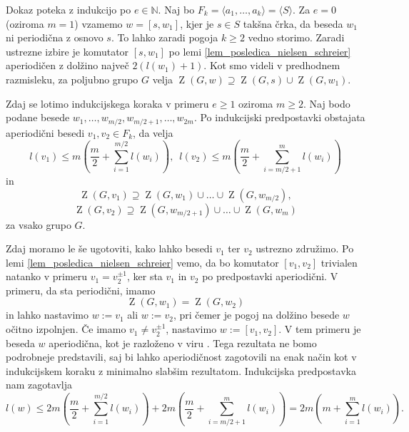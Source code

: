     \begin{dokaz}
        Dokaz poteka z indukcijo po $e \in  \mathbb{N}$. Naj bo $F_k = \langle a_1, \ldots , a_{k} \rangle = \langle S \rangle$.  Za $e = 0$ (oziroma $m = 1$) vzamemo $w = [s, w_1]$, kjer je $s \in S$ takšna črka, da beseda $w_1$ ni periodična z osnovo $s$. 
        To lahko zaradi pogoja $k \ge 2$ vedno storimo. Zaradi ustrezne izbire je komutator $[s, w_1]$ po lemi \ref{lem_posledica_nielsen_schreier} aperiodičen z dolžino največ $2(l(w_1)  + 1)$.
        Kot smo videli v predhodnem razmisleku, za poljubno grupo $G$ velja $\operatorname{Z}(G, w) \supseteq \operatorname{Z}(G, s) \cup \operatorname{Z}(G, w_1)$.
        
        Zdaj se lotimo indukcijskega koraka v primeru $e \ge 1$ oziroma $m \ge 2$. Naj bodo podane besede $w_1, \ldots, w_{m / 2}, w_{m / 2 + 1}, \ldots, w_{2m}$. Po indukcijski predpostavki obstajata aperiodični besedi $v_1, v_2 \in  F_{k}$,  da velja
        \begin{equation*}
        l(v_1) \le m \left(\frac{m}{2} + \sum_{i=1}^{m / 2} l(w_{i}) \right), \,\,\, l(v_2) \le m \left(\frac{m}{2} + \sum_{i= m / 2 + 1}^{m} l(w_{i}) \right)
        \end{equation*}  
        in \begin{equation*}
        \operatorname{Z}(G, v_1) \supseteq \operatorname{Z}(G, w_1) \cup \ldots \cup \operatorname{Z}(G, w_{m / 2}),
        \end{equation*}  
        \begin{equation*}
            \operatorname{Z}(G, v_2) \supseteq \operatorname{Z}(G, w_{m / 2 + 1}) \cup \ldots \cup \operatorname{Z}(G, w_{m})
        \end{equation*}  
        za vsako grupo $G$.

        Zdaj moramo le še ugotoviti, kako lahko besedi $v_1$ ter $v_2$ ustrezno združimo. Po lemi \ref{lem_posledica_nielsen_schreier} vemo, da bo komutator $[v_1, v_2]$ trivialen natanko v primeru $v_1 = v_2^{\pm 1}$, ker sta $v_1$ in $v_2$ po predpostavki aperiodični. V primeru, da sta periodični, imamo \begin{equation*}
        \operatorname{Z}(G, w_1) = \operatorname{Z}(G, w_2)
        \end{equation*}  
         in lahko nastavimo $w := v_1$ ali $w := v_2$, pri čemer je pogoj na dolžino besede $w$ očitno izpolnjen. Če imamo $v_1 \neq v_2^{\pm 1}$, nastavimo $w := [v_1, v_2]$. V tem primeru je beseda $w$ aperiodična, kot je razloženo v viru \cite{Schutzenberger_1959}. Tega rezultata ne bomo podrobneje predstavili, saj bi lahko aperiodičnost
         zagotovili na enak način kot v indukcijskem koraku z minimalno slabšim rezultatom. Indukcijska predpostavka nam zagotavlja 
         \begin{equation*}
         l(w) \le 2m  \left(\frac{m}{2} + \sum_{i=1}^{m / 2} l(w_{i}) \right) + 2m \left(\frac{m}{2} + \sum_{i= m / 2 + 1}^{m} l(w_{i}) \right) = 2m \left( m + \sum_{i = 1}^{m} l(w_{i}) \right).
         \end{equation*}
    \end{dokaz}

